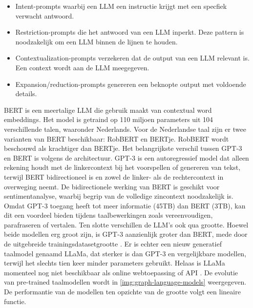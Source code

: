 \begin{itemize}
	\item	Intent-prompts waarbij een LLM een instructie krijgt met een specfiek verwacht antwoord.
	\item	Restriction-prompts die het antwoord van een LLM inperkt. Deze pattern is noodzakelijk om een LLM binnen de lijnen te houden.
	\item 	Contextualization-prompts verzekeren dat de output van een LLM relevant is. Een context wordt aan de LLM meegegeven.
	\item	Expansion/reduction-prompts genereren een beknopte output met voldoende details. 
\end{itemize}

\medspace

BERT is een meertalige LLM die gebruik maakt van contextual word embeddings. Het model is getraind op 110 miljoen parameters uit 104 verschillende talen, waaronder Nederlands. Voor de Nederlandse taal zijn er twee varianten van BERT beschikbaar: RobBERT en BERTje. RobBERT wordt beschouwd als krachtiger dan BERTje. Het belangrijkste verschil tussen GPT-3 en BERT is volgens \textcite{Mottesi2023} de architectuur. GPT-3 is een autoregressief model dat alleen rekening houdt met de linkercontext bij het voorspellen of genereren van tekst, terwijl BERT bidirectioneel is en zowel de linker- als de rechtercontext in overweging neemt. De bidirectionele werking van BERT is geschikt voor sentimentanalyse, waarbij begrip van de volledige zincontext noodzakelijk is. Omdat GPT-3 toegang heeft tot meer informatie (45TB) dan BERT (3TB), kan dit een voordeel bieden tijdens taalbewerkingen zoals vereenvoudigen, parafraseren of vertalen. Ten slotte verschillen de LLM's ook qua grootte. Hoewel beide modellen erg groot zijn, is GPT-3 aanzienlijk groter dan BERT, mede door de uitgebreide trainingsdatasetgrootte \autocite{Brown2020}. Er is echter een nieuw generatief taalmodel genaamd LLaMa, dat sterker is dan GPT-3 en vergelijkbare modellen, terwijl het slechts tien keer minder parameters gebruikt. Helaas is LLaMa momenteel nog niet beschikbaar als online webtoepassing of API \autocite{Hern2023, Touvron2023}.  De evolutie van pre-trained taalmodellen wordt in \ref{img:graph-language-models} weergegeven. De performantie van de modellen ten opzichte van de grootte volgt een lineaire functie.

\medspace

